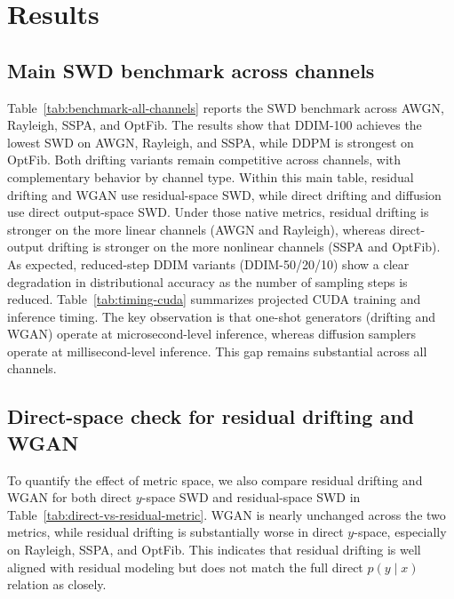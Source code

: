 \documentclass[conference]{IEEEtran}
\begin{document}
\section{Results}
\subsection{Main SWD benchmark across channels}
Table~\ref{tab:benchmark-all-channels} reports the SWD benchmark across AWGN, Rayleigh, SSPA, and OptFib.
The results show that DDIM-100 achieves the lowest SWD on AWGN, Rayleigh, and SSPA, while DDPM is strongest on OptFib.
Both drifting variants remain competitive across channels, with complementary behavior by channel type.
Within this main table, residual drifting and WGAN use residual-space SWD, while direct drifting and diffusion use direct output-space SWD.
Under those native metrics, residual drifting is stronger on the more linear channels (AWGN and Rayleigh), whereas direct-output drifting is stronger on the more nonlinear channels (SSPA and OptFib).
As expected, reduced-step DDIM variants (DDIM-50/20/10) show a clear degradation in distributional accuracy as the number of sampling steps is reduced. Table~\ref{tab:timing-cuda} summarizes projected CUDA training and inference timing. The key observation is that one-shot generators (drifting and WGAN) operate at microsecond-level inference, whereas diffusion samplers operate at millisecond-level inference.
This gap remains substantial across all channels. 





\subsection{Direct-space check for residual drifting and WGAN}
To quantify the effect of metric space, we also compare residual drifting and WGAN for both direct \(y\)-space SWD and residual-space SWD in Table~\ref{tab:direct-vs-residual-metric}.
WGAN is nearly unchanged across the two metrics, while residual drifting is substantially worse in direct \(y\)-space, especially on Rayleigh, SSPA, and OptFib.
This indicates that residual drifting is well aligned with residual modeling but does not match the full direct \(p(y\mid x)\) relation as closely.


\end{document}
